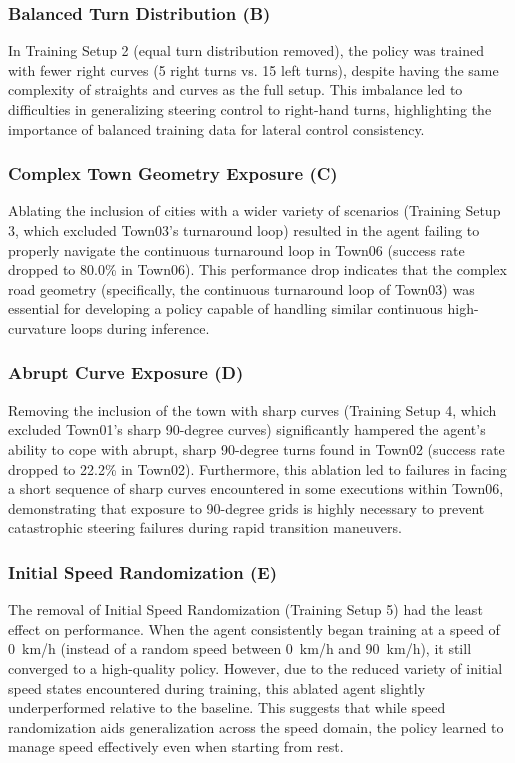\documentclass[sn-mathphys,Numbered]{sn-jnl}
\begin{document}
\subsubsection{Balanced Turn Distribution (B)}
In Training Setup 2 (equal turn distribution removed), the policy was trained with fewer right curves (5 right turns vs. 15 left turns), despite having the same complexity of straights and curves as the full setup. This imbalance led to difficulties in generalizing steering control to right-hand turns, highlighting the importance of balanced training data for lateral control consistency.

\subsubsection{Complex Town Geometry Exposure (C)}
Ablating the inclusion of cities with a wider variety of scenarios (Training Setup 3, which excluded Town03's turnaround loop) resulted in the agent failing to properly navigate the continuous turnaround loop in Town06 (success rate dropped to 80.0\% in Town06). This performance drop indicates that the complex road geometry (specifically, the continuous turnaround loop of Town03) was essential for developing a policy capable of handling similar continuous high-curvature loops during inference.

\subsubsection{Abrupt Curve Exposure (D)}
Removing the inclusion of the town with sharp curves (Training Setup 4, which excluded Town01's sharp 90-degree curves) significantly hampered the agent's ability to cope with abrupt, sharp 90-degree turns found in Town02 (success rate dropped to 22.2\% in Town02). Furthermore, this ablation led to failures in facing a short sequence of sharp curves encountered in some executions within Town06, demonstrating that exposure to 90-degree grids is highly necessary to prevent catastrophic steering failures during rapid transition maneuvers.

\subsubsection{Initial Speed Randomization (E)}
The removal of Initial Speed Randomization (Training Setup 5) had the least effect on performance. When the agent consistently began training at a speed of \SI{0}{km/h} (instead of a random speed between \SI{0}{km/h} and \SI{90}{km/h}), it still converged to a high-quality policy. However, due to the reduced variety of initial speed states encountered during training, this ablated agent slightly underperformed relative to the baseline. This suggests that while speed randomization aids generalization across the speed domain, the policy learned to manage speed effectively even when starting from rest.
\end{document}
